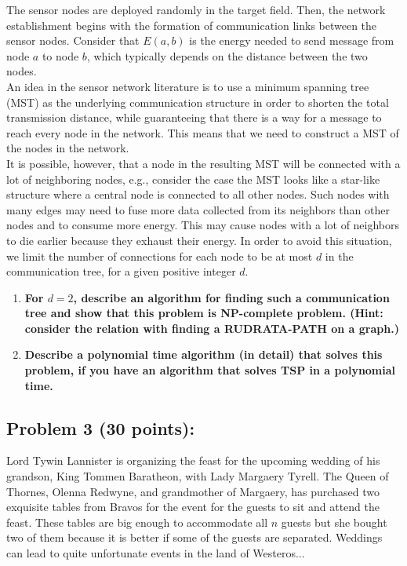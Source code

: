 \documentclass[11pt]{article}
\begin{document}
\noindent The sensor nodes are deployed randomly in the target
field. Then, the network establishment begins with the formation of
communication links between the sensor nodes. Consider that $E(a,b)$
is the energy needed to send message from node $a$ to node $b$, which
typically depends on the distance between the two nodes.\\

\noindent An idea in the sensor network literature is to use a minimum
spanning tree (MST) as the underlying communication structure in order
to shorten the total transmission distance, while guaranteeing that
there is a way for a message to reach every node in the network. This
means that we need to construct a MST of the nodes in the network.\\

\noindent It is possible, however, that a node in the resulting MST
will be connected with a lot of neighboring nodes, e.g., consider the
case the MST looks like a star-like structure where a central node is
connected to all other nodes. Such nodes with many edges may need to
fuse more data collected from its neighbors than other nodes and to
consume more energy.  This may cause nodes with a lot of neighbors to
die earlier because they exhaust their energy.  In order to avoid this
situation, we limit the number of connections for each node to be at
most $d$ in the communication tree, for a given positive integer
$d$.\\

\begin{enumerate}[label=\textbf{\Alph*.}]
\item \textbf{For $d = 2$, describe an algorithm for finding such
a communication tree and show that this problem is NP-complete
problem.  (Hint: consider the relation with finding a RUDRATA-PATH on
a graph.)}

\item \textbf{Describe a polynomial time algorithm (in detail)
that solves this problem, if you have an algorithm that solves TSP in
a polynomial time. }
\end{enumerate}

\subsection*{Problem 3 (30 points):} Lord Tywin Lannister is
organizing the feast for the upcoming wedding of his grandson, King
Tommen Baratheon, with Lady Margaery Tyrell. The Queen of Thornes,
Olenna Redwyne, and grandmother of Margaery, has purchased two
exquisite tables from Bravos for the event for the guests to sit and
attend the feast. These tables are big enough to accommodate all $n$
guests but she bought two of them because it is better if some of the
guests are separated. Weddings can lead to quite unfortunate events in
the land of Westeros...\\
\end{document}
